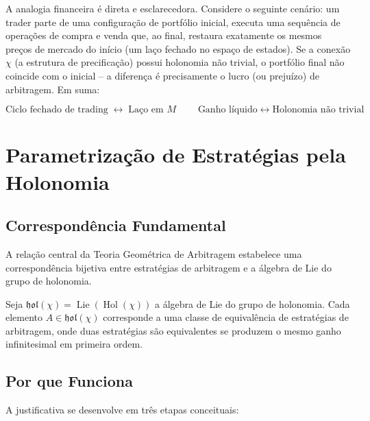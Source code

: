 A analogia financeira \'e direta e esclarecedora. Considere o seguinte cen\'ario: um trader parte de uma configura\c{c}\~ao de portf\'olio inicial, executa uma sequ\^encia de opera\c{c}\~oes de compra e venda que, ao final, restaura exatamente os mesmos pre\c{c}os de mercado do in\'icio (um la\c{c}o fechado no espa\c{c}o de estados). Se a conex\~ao \(\chi\) (a estrutura de precifica\c{c}\~ao) possui holonomia n\~ao trivial, o portf\'olio final n\~ao coincide com o inicial -- a diferen\c{c}a \'e precisamente o lucro (ou preju\'izo) de arbitragem. Em suma:

\[
\boxed{\text{Ciclo fechado de trading} \;\longleftrightarrow\; \text{La\c{c}o em } M}
\qquad
\boxed{\text{Ganho l\'iquido} \;\longleftrightarrow\; \text{Holonomia n\~ao trivial}}
\]

\section{Parametriza\c{c}\~ao de Estrat\'egias pela Holonomia}

\subsection{Correspond\^encia Fundamental}

A rela\c{c}\~ao central da Teoria Geom\'etrica de Arbitragem estabelece uma correspond\^encia bijetiva entre estrat\'egias de arbitragem e a \'algebra de Lie do grupo de holonomia.

\begin{prop}
Seja \(\mathfrak{hol}(\chi) = \operatorname{Lie}(\operatorname{Hol}(\chi))\) a \'algebra de Lie do grupo de holonomia. Cada elemento \(A \in \mathfrak{hol}(\chi)\) corresponde a uma classe de equival\^encia de estrat\'egias de arbitragem, onde duas estrat\'egias s\~ao equivalentes se produzem o mesmo ganho infinitesimal em primeira ordem.
\end{prop}

\subsection{Por que Funciona}

A justificativa se desenvolve em tr\^es etapas conceituais:

